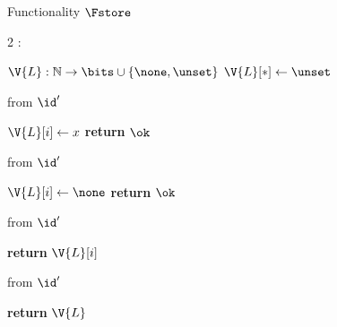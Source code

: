 \begin{interface}[nofloat]{Functionality $\Fstore$ \\
\params{$\PID$, \quad $\Ps$, \quad $\admits$, \quad $\uses := \emptyset$, \quad $\pars := \none$}}

{\scriptsize
\setlength{\columnsep}{1.4em}
\begin{multicols}{2}
:
\begin{algorithmic}[1]
\setcounter{contline}{0}\algcont
\State $\V{L} : \mathbb{N} \to \bits \cup \{\none,\unset\}$
\State $\V{L}[*] \gets \unset$
\algsave
\end{algorithmic}
\vspace{1.4ex}

 \quad from $\id'$
\begin{algorithmic}[1]
\algcont
{} \label{ln:putfree}
\State $\V{L}[i] \gets x$ \label{ln:putwrite}
\State \textbf{return} $\ok$
\algsave
\end{algorithmic}
\vspace{1.4ex}

 \quad from $\id'$
\begin{algorithmic}[1]
\algcont
\State $\V{L}[i] \gets \none$ \label{ln:storeerase}
\State \textbf{return} $\ok$
\algsave
\end{algorithmic}
\vspace{1.4ex}

\columnbreak

 \quad from $\id'$
\begin{algorithmic}[1]
\algcont
{} \label{ln:getset}
\State \textbf{return} $\V{L}[i]$ \label{ln:getread}
\algsave
\end{algorithmic}
\vspace{1.4ex}

 \quad from $\id'$
\begin{algorithmic}[1]
\algcont
\State \textbf{return} $\V{L}$
\algsave
\end{algorithmic}
\end{multicols}}
\end{interface}
